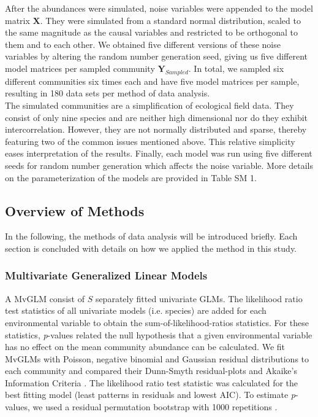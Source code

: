 \documentclass[a4paper,11pt]{article}
\begin{document}
	    
		After the abundances were simulated, noise variables were appended to the model matrix $\mathbf{X}$.
		They were simulated from a standard normal distribution, scaled to the same magnitude as the causal variables and restricted to be orthogonal to them and to each other.  
	    We obtained five different versions of these noise variables by altering the random number generation seed,  giving us five different model matrices per sampled community $\mathbf{Y}_{Sampled}$.  
	    In total, we sampled six different communities six times each and have five model matrices per sample, resulting in 180 data sets per method of data analysis.\\
        The simulated communities are a simplification of ecological field data. 
        They consist of only nine species and are neither high dimensional nor do they exhibit intercorrelation.
        However, they are not normally distributed and sparse, thereby featuring two of the common issues mentioned above. 
        This relative simplicity eases interpretation of the results.
        Finally, each model was run using five different seeds for random number generation which affects the noise variable. 
        More details on the parameterization of the models are provided in Table SM 1.

    
    \subsection*{Overview of Methods}
        
        In the following, the methods of data analysis will be introduced briefly. 
        Each section is concluded with details on how we applied the method in this study.  \\
    \subsubsection*{Multivariate Generalized Linear Models}
		A MvGLM consist of $S$ separately fitted univariate GLMs. 
		The likelihood ratio test statistics of all univariate models (i.e. species) are added for each environmental variable to obtain the sum-of-likelihood-ratios statistics.  
		For these statistics, \textit{p}-values related the null hypothesis that a given environmental variable has no effect on the mean community abundance can be calculated. 
		We fit MvGLMs with Poisson, negative binomial and Gaussian residual distributions to each community and compared their Dunn-Smyth residual-plots \citep{dunn1996randomized} and Akaike's Information Criteria \citep[AIC, ][]{akaike1974new}.
		The likelihood ratio test statistic was calculated for the best fitting model (least patterns in residuals and lowest AIC).
	    To estimate \textit{p}-values, we used a residual permutation bootstrap with 1000 repetitions \citep{davidsonbootstrap}.
	
\end{document}
